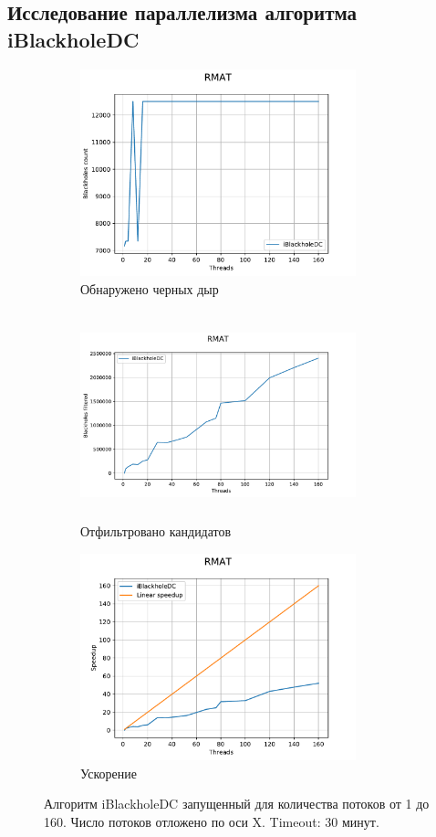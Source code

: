 \documentclass[12pt,a4paper,oneside,openany]{article}
\theoremstyle{definition}
\theoremstyle{lemma}
\theoremstyle{remark}
\begin{document}
\subsection{Исследование параллелизма алгоритма iBlackholeDC}\label{subsec:chinesemanythreads}

\begin{figure}[H]
    \begin{subfigure}{.5\textwidth}
      \centering
      \includegraphics[width=8cm]{images/5_count.pdf}
      \caption{Обнаружено черных дыр}
      \label{fig:chinesemany:count}
    \end{subfigure}
    \begin{subfigure}{.5\textwidth}
      \centering
      \includegraphics[width=8cm,height=6cm]{images/5_filtered.pdf}
      \caption{Отфильтровано кандидатов}
      \label{fig:chinesemany:filtered}
    \end{subfigure}
    \begin{subfigure}{.5\textwidth}
      \centering
      \includegraphics[width=8cm]{images/5_filtered_speedup.pdf}
      \caption{Ускорение}
      \label{fig:chinesemany:speedup}
    \end{subfigure}
    \caption{Алгоритм iBlackholeDC запущенный для количества потоков от 1 до 160. Число потоков отложено по оси X. Timeout: 30 минут.}
    \label{fig:chinesemany}
\end{figure}
\end{document}
